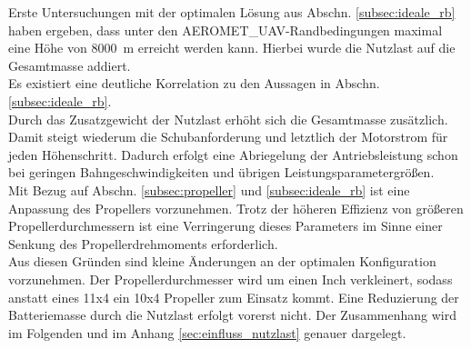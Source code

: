 Erste Untersuchungen mit der optimalen Lösung aus Abschn. \ref{subsec:ideale_rb} haben ergeben, dass unter den AEROMET\_UAV-Randbedingungen maximal eine Höhe von \SI{8000}{m} erreicht werden kann. Hierbei wurde die Nutzlast auf die Gesamtmasse addiert. \\
Es existiert eine deutliche Korrelation zu den Aussagen in Abschn. \ref{subsec:ideale_rb}.\\
Durch das Zusatzgewicht der Nutzlast erhöht sich die Gesamtmasse zusätzlich. Damit steigt wiederum die Schubanforderung und letztlich der Motorstrom für jeden Höhenschritt. Dadurch erfolgt eine Abriegelung der Antriebsleistung schon bei geringen Bahngeschwindigkeiten und übrigen Leistungsparametergrößen. \\
Mit Bezug auf Abschn. \ref{subsec:propeller} und \ref{subsec:ideale_rb} ist eine Anpassung des Propellers vorzunehmen. Trotz der höheren Effizienz von größeren Propellerdurchmessern ist eine Verringerung dieses Parameters im Sinne einer Senkung des Propellerdrehmoments erforderlich. \\
Aus diesen Gründen sind kleine Änderungen an der optimalen Konfiguration vorzunehmen. Der Propellerdurchmesser wird um einen Inch verkleinert, sodass anstatt eines 11x4 ein 10x4 Propeller zum Einsatz kommt. Eine Reduzierung der Batteriemasse durch die Nutzlast erfolgt vorerst nicht. Der Zusammenhang wird im Folgenden und im Anhang \ref{sec:einfluss_nutzlast} genauer dargelegt.

